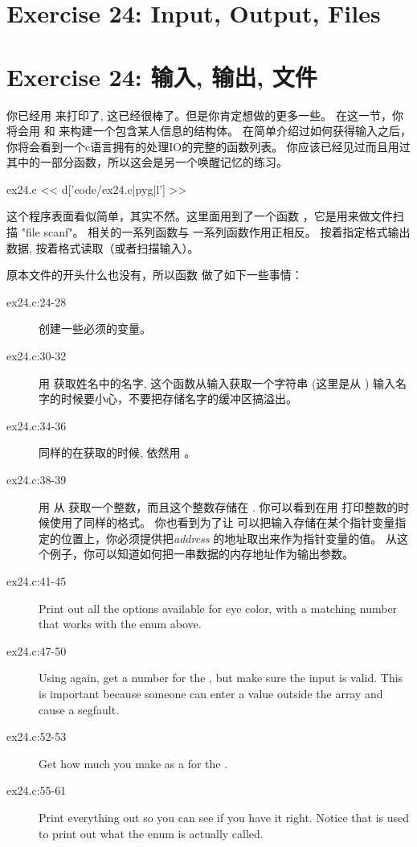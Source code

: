 \chapter{Exercise 24: Input, Output, Files}
\chapter{Exercise 24: 输入, 输出, 文件}

你已经用  来打印了, 这已经很棒了。但是你肯定想做的更多一些。 
在这一节，你将会用  和  来构建一个包含某人信息的结构体。
在简单介绍过如何获得输入之后，你将会看到一个c语言拥有的处理IO的完整的函数列表。
你应该已经见过而且用过其中的一部分函数，所以这会是另一个唤醒记忆的练习。

\begin{code}{ex24.c}
<< d['code/ex24.c|pyg|l'] >>
\end{code}

这个程序表面看似简单，其实不然。这里面用到了一个函数 ，它是用来做文件扫描 "file scanf"。
  相关的一系列函数与  一系列函数作用正相反。 
  按着指定格式输出数据,  按着格式读取（或者扫描输入）。

原本文件的开头什么也没有，所以函数  做了如下一些事情：

\begin{description}
\item[ex24.c:24-28] 创建一些必须的变量。
\item[ex24.c:30-32] 用 获取姓名中的名字, 这个函数从输入获取一个字符串
    (这里是从 ) 输入名字的时候要小心，不要把存储名字的缓冲区搞溢出。
\item[ex24.c:34-36] 同样的在获取的时候, 依然用 。
\item[ex24.c:38-39] 用 从 获取一个整数，而且这个整数存储在
    .  你可以看到在用 打印整数的时候使用了同样的格式。
    你也看到为了让  可以把输入存储在某个指针变量指定的位置上，你必须提供把\emph{address} 的地址取出来作为指针变量的值。 从这个例子，你可以知道如何把一串数据的内存地址作为输出参数。
\item[ex24.c:41-45] Print out all the options available for eye color, with a matching
    number that works with the  enum above.
\item[ex24.c:47-50] Using  again, get a number for the , 
    but make sure the input is valid.  This is important because someone can
    enter a value outside the  array and cause a 
    segfault.
\item[ex24.c:52-53] Get how much you make as a  for the .
\item[ex24.c:55-61] Print everything out so you can see if you have it right.  Notice
    that  is used to print out what the 
    enum is actually called.
\end{description}


